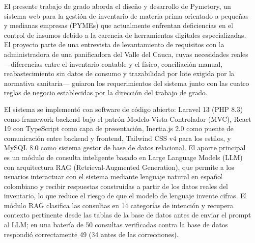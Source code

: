 

El presente trabajo de grado aborda el diseño y desarrollo de Pymetory, un sistema web para la gestión de inventario de materia prima orientado a pequeñas y medianas empresas (PYMEs) \cite{bbva2024mipymes,conpes4069} que actualmente enfrentan deficiencias en el control de insumos debido a la carencia de herramientas digitales especializadas. El proyecto parte de una entrevista de levantamiento de requisitos con la administradora de una panificadora del Valle del Cauca, cuyas necesidades reales ---diferencias entre el inventario contable y el físico, conciliación manual, reabastecimiento sin datos de consumo y trazabilidad por lote exigida por la normativa sanitaria--- guiaron los requerimientos del sistema junto con las cuatro reglas de negocio establecidas por la dirección del trabajo de grado.

El sistema se implementó con software de código abierto: Laravel 13 (PHP 8.3) como framework backend bajo el patrón Modelo-Vista-Controlador (MVC), React 19 con TypeScript como capa de presentación, Inertia.js 2.0 como puente de comunicación entre backend y frontend, Tailwind CSS v4 para los estilos, y MySQL 8.0 como sistema gestor de base de datos relacional. El aporte principal es un módulo de consulta inteligente basado en Large Language Models (LLM) con arquitectura RAG (Retrieval-Augmented Generation), que permite a los usuarios interactuar con el sistema mediante lenguaje natural en español colombiano y recibir respuestas construidas a partir de los datos reales del inventario, lo que reduce el riesgo de que el modelo de lenguaje invente cifras. El módulo RAG clasifica las consultas en 14 categorías de intención y recupera contexto pertinente desde las tablas de la base de datos antes de enviar el prompt al LLM; en una batería de 50 consultas verificadas contra la base de datos respondió correctamente 49 (34 antes de las correcciones).


